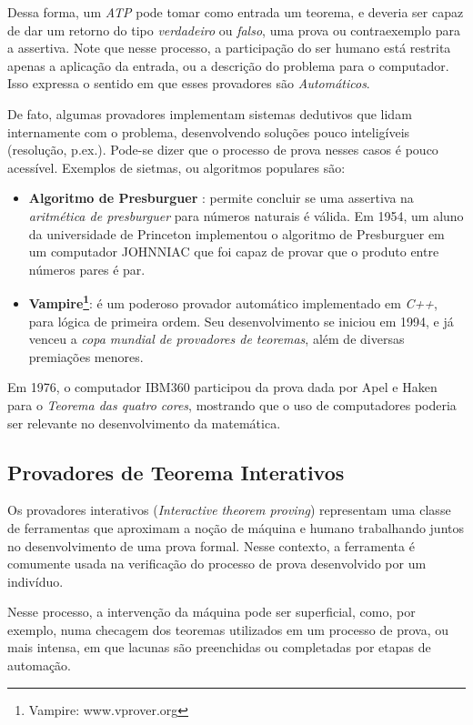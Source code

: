 Dessa forma, um \textit{ATP} pode tomar como entrada um teorema, e deveria ser capaz de dar um retorno do tipo \textit{verdadeiro} ou \textit{falso}, uma prova ou contraexemplo para a assertiva.
Note que nesse processo, a participação do ser humano está restrita apenas a aplicação da entrada, ou a descrição do problema para o computador.
Isso expressa o sentido em que esses provadores são \textit{Automáticos}.

De fato, algumas provadores implementam sistemas dedutivos que lidam internamente com o problema, desenvolvendo soluções pouco inteligíveis (resolução, p.ex.).
Pode-se dizer que o processo de prova nesses casos é pouco acessível. Exemplos de sietmas, ou algoritmos populares são:

\begin{itemize}
    \item \textbf{Algoritmo de Presburguer} : permite concluir se uma assertiva na \textit{aritmética de presburguer} para números naturais é válida. Em 1954, um aluno da universidade de Princeton implementou o algoritmo de Presburguer em um computador JOHNNIAC que foi capaz de provar que o produto entre números pares é par.
    \item \textbf{Vampire\footnote{Vampire: www.vprover.org}}: é um poderoso provador automático implementado em \textit{C++}, para lógica de primeira ordem. Seu desenvolvimento se iniciou em 1994, e já venceu a \textit{copa mundial de provadores de teoremas}, além de diversas premiações menores.
\end{itemize}

Em 1976, o computador IBM360 participou da prova dada por Apel e Haken para o \textit{Teorema das quatro cores}, mostrando que o uso de computadores poderia ser relevante no desenvolvimento da matemática.

\subsection{Provadores de Teorema Interativos}

Os provadores interativos (\textit{Interactive theorem proving}) representam uma classe de ferramentas que aproximam a noção de máquina e humano trabalhando juntos no desenvolvimento de uma prova formal.
Nesse contexto, a ferramenta é comumente usada na verificação do processo de prova desenvolvido por um indivíduo.

Nesse processo, a intervenção da máquina pode ser superficial, como, por exemplo, numa checagem dos teoremas utilizados em um processo de prova, ou mais intensa, em que lacunas são preenchidas ou completadas por etapas de automação.	

